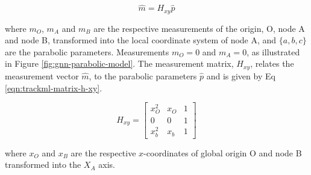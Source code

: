 \begin{equation}
    \hat{m} = H_{xy} \hat{p} 
    \label{eqn:parabolic-equations}
\end{equation}

where $m_O$, $m_A$ and $m_B$ are the respective measurements of the origin, O, node A and node B, transformed into the local coordinate system of node A, and $\{a, b, c\}$ are the parabolic parameters. Measurements $m_O = 0$ and $m_A = 0$, as illustrated in Figure \ref{fig:gnn-parabolic-model}. The measurement matrix, $H_{xy}$, relates the measurement vector $\hat{m}$, to the parabolic parameters $\hat{p}$ and is given by Eq \eqref{eqn:trackml-matrix-h-xy}.

\begin{equation}
    H_{xy} = \begin{bmatrix} x_O^{2} & x_O & 1 \\ 0 & 0 & 1 \\ x_b^{2} & x_b & 1 \end{bmatrix} 
    \label{eqn:trackml-matrix-h-xy}
\end{equation}

where $x_O$ and $x_B$ are the respective $x$-coordinates of global origin O and node B transformed into the $X_A$ axis.



